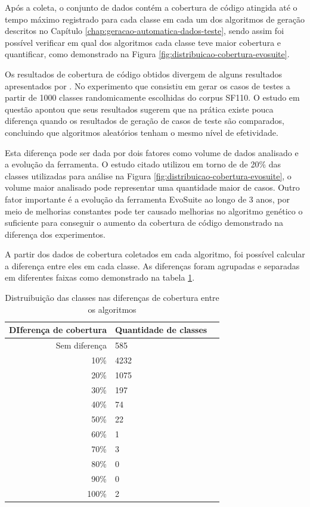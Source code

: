 \documentclass[
	12pt,				%
	oneside,			%
	a4paper,			%
	english,			%
	brazil				%
	]{abntex2ppgsi}
\begin{document}
Após a coleta, o conjunto de dados contém a cobertura de código atingida até o tempo máximo registrado para cada classe em cada um dos algoritmos de geração descritos no Capítulo \autoref{chap:geracao-automatica-dados-teste}, sendo assim foi possível verificar em qual dos algoritmos cada classe teve maior cobertura e quantificar, como demonstrado na Figura \ref{fig:distribuicao-cobertura-evosuite}. 

Os resultados de cobertura de código obtidos divergem de alguns resultados apresentados por \cite{shamriski20151115}. No experimento que consistiu em gerar os casos de testes a partir de 1000 classes randomicamente escolhidas do corpus SF110. O estudo em questão apontou que seus resultados sugerem que na prática existe pouca diferença quando os resultados de geração de casos de teste são comparados, concluindo que algoritmos aleatórios tenham o mesmo nível de efetividade.

Esta diferença pode ser dada por dois fatores como volume de dados analisado e a evolução da ferramenta. O estudo citado utilizou em torno de de 20\% das classes utilizadas para análise na Figura \ref{fig:distribuicao-cobertura-evosuite}, o volume maior analisado pode representar uma quantidade maior de casos. Outro fator importante é a evolução da ferramenta EvoSuite ao longo de 3 anos,  por meio de melhorias constantes pode ter causado melhorias no algoritmo genético o suficiente para conseguir o aumento da cobertura de código demonstrado na diferença dos experimentos.

A partir dos dados de cobertura coletados em cada algoritmo, foi possível calcular a diferença entre eles em cada classe. As diferenças foram agrupadas e separadas em diferentes faixas como demonstrado na tabela \ref{table:distribuicao-diferenca-cobertura-porcentagem}.



\begin{table}[h]

\centering
\caption{Distruibuição das classes nas diferenças de cobertura entre os algoritmos}
\vspace{0.5cm}
\begin{tabular}{r|lr}

DIferença de cobertura & Quantidade de classes \\ %
\hline                               %
Sem diferença  & 	585 \\
10\%	& 	4232 \\
20\%	& 	1075 \\
30\%	& 	197 \\
40\%	& 	74 \\
50\%	& 	22 \\
60\%	& 	1 \\
70\%	& 	3 \\
80\%	& 	0 \\
90\%	& 	0 \\
100\%	& 	2


\end{tabular}
\label{table:distribuicao-diferenca-cobertura-porcentagem}
\end{table}
\end{document}
